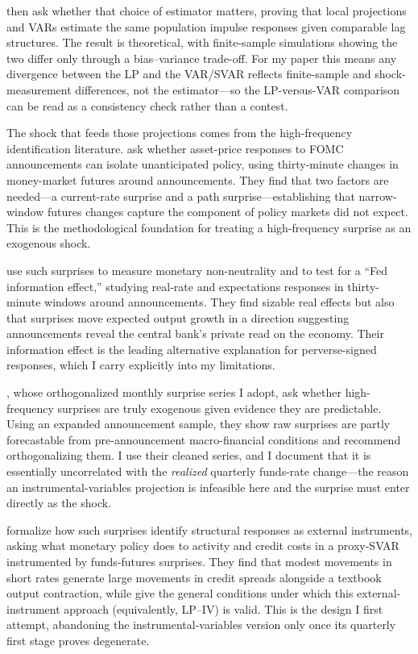 \documentclass[11pt]{article}
\begin{document}
\citet{plagborg2021} then ask whether that choice of estimator matters, proving that local
projections and VARs estimate the same population impulse responses given comparable lag
structures. The result is theoretical, with finite-sample simulations showing the two differ only
through a bias--variance trade-off. For my paper this means any divergence between the LP and the
VAR/SVAR reflects finite-sample and shock-measurement differences, not the estimator---so the
LP-versus-VAR comparison can be read as a consistency check rather than a contest.

The shock that feeds those projections comes from the high-frequency identification literature.
\citet{gss2005} ask whether asset-price responses to FOMC announcements can isolate unanticipated
policy, using thirty-minute changes in money-market futures around announcements. They find that
two factors are needed---a current-rate surprise and a path surprise---establishing that
narrow-window futures changes capture the component of policy markets did not expect. This is the
methodological foundation for treating a high-frequency surprise as an exogenous shock.

\citet{nakamura2018} use such surprises to measure monetary non-neutrality and to test for a
``Fed information effect,'' studying real-rate and expectations responses in thirty-minute windows
around announcements. They find sizable real effects but also that surprises move expected output
growth in a direction suggesting announcements reveal the central bank's private read on the
economy. Their information effect is the leading alternative explanation for perverse-signed
responses, which I carry explicitly into my limitations.

\citet{bauerswanson2023}, whose orthogonalized monthly surprise series I adopt, ask whether
high-frequency surprises are truly exogenous given evidence they are predictable. Using an expanded
announcement sample, they show raw surprises are partly forecastable from pre-announcement
macro-financial conditions and recommend orthogonalizing them. I use their cleaned series, and I
document that it is essentially uncorrelated with the \emph{realized} quarterly funds-rate
change---the reason an instrumental-variables projection is infeasible here and the surprise must
enter directly as the shock.

\citet{gertlerkaradi2015} formalize how such surprises identify structural responses as external
instruments, asking what monetary policy does to activity and credit costs in a proxy-SVAR
instrumented by funds-futures surprises. They find that modest movements in short rates generate
large movements in credit spreads alongside a textbook output contraction, while
\citet{stockwatson2018} give the general conditions under which this external-instrument approach
(equivalently, LP--IV) is valid. This is the design I first attempt, abandoning the
instrumental-variables version only once its quarterly first stage proves degenerate.
\end{document}
